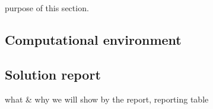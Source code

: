 %
%


purpose of this section.

\subsection{Computational environment}


\subsection{Solution report}
what \& why we will show by the report, reporting table


